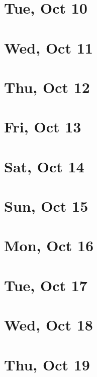 	\section{Tue, Oct 10}
		
		
	\section{Wed, Oct 11}
		
		
	\section{Thu, Oct 12}
		
		
	\section{Fri, Oct 13}
		
		
	\section{Sat, Oct 14}
		
		
	\section{Sun, Oct 15}
		
		
	\section{Mon, Oct 16}
		
		
	\section{Tue, Oct 17}
		
		
	\section{Wed, Oct 18}
		
		
	\section{Thu, Oct 19}
		
		

